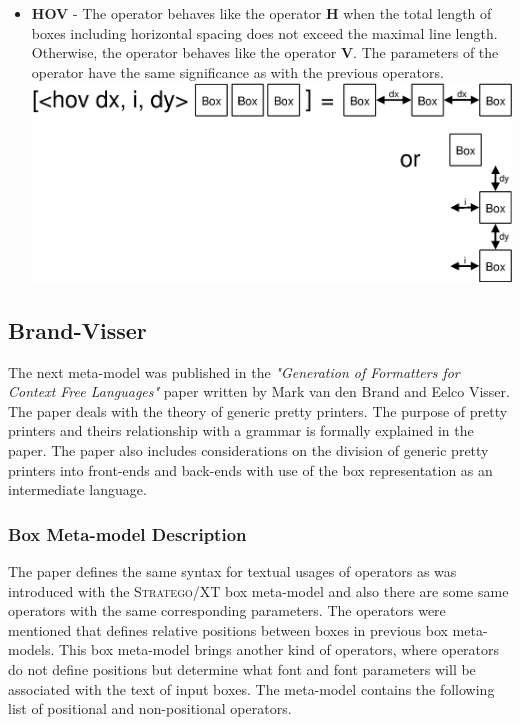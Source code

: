 \documentclass[12pt,notitlepage,a4paper]{report}
\begin{document}
\begin{itemize}
\item \textbf{HOV} - The operator behaves like the operator \textbf{H} when the total length of boxes including horizontal spacing does not exceed the maximal line length. Otherwise, the operator behaves like the operator \textbf{V}. The parameters of the operator have the same significance as with the previous operators.
\includegraphics[scale=0.4]{pictures/PPML-HOV.eps}
\end{itemize}

\subsection {Brand-Visser}

The next meta-model was published in the \textit{"Generation of Formatters for Context Free Languages"} paper \cite{Brand-Visser} written  by Mark van den Brand and Eelco Visser. The paper deals with the theory of generic pretty printers. The purpose of pretty printers and theirs relationship with a grammar is formally explained in the paper. The paper also includes considerations on the division of generic pretty printers into front-ends and back-ends with use of the box representation as an intermediate language. 

\subsubsection{Box Meta-model Description}

The paper defines the same syntax for textual usages of operators as was introduced with the \textsc{Stratego/XT} box meta-model and also there are some same operators with the same corresponding parameters. The operators were mentioned that defines relative positions between boxes in previous box meta-models. This box meta-model brings another kind of operators, where operators do not define positions but determine what font and font parameters will be associated with the text of input boxes. The meta-model contains the following list of positional and non-positional operators.
\end{document}
